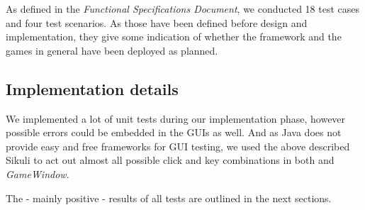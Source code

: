 As defined in the \emph{Functional Specifications Document}, we conducted 18 test cases and four test scenarios. As those have been defined before design and implementation, they give some indication of whether the framework and the games in general have been deployed as planned.\par

\subsection{Implementation details}
We implemented a lot of unit tests during our implementation phase, however possible errors could be embedded in the GUIs as well. And as Java does not provide easy and free frameworks for GUI testing, we used the above described Sikuli to act out almost all possible click and key combinations in both \gameexplorer and \emph{GameWindow}.\par
The - mainly positive - results of all tests are outlined in the next sections.\par
